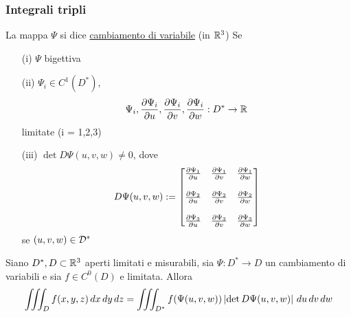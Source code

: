 \subsubsection{Integrali tripli}
\begin{definition}
  La mappa $\Psi$ si dice \underline{cambiamento di variabile} (in $\mathbb{R}^3$) Se
  \begin{itemize}
    \item[(i)] $\Psi$ \ace bigettiva
    \item[(ii)] $\Psi_i \in C^1(D^*)$, 
                $$\Psi_i, \frac{\partial \Psi_i}{\partial u}, \frac{\partial \Psi_i}{\partial v}, \frac{\partial \Psi_i}{\partial w} : D^* \to \mathbb{R}$$
                limitate (i = 1,2,3) 
    \item[(iii)] $\det D\Psi(u,v,w) \neq 0$, dove 
                $$D\Psi(u,v,w) := \begin{bmatrix}
                  \frac{\partial \Psi_1}{\partial u} & \frac{\partial \Psi_1}{\partial v} & \frac{\partial \Psi_1}{\partial w} \\
                  \\
                  \frac{\partial \Psi_2}{\partial u} & \frac{\partial \Psi_2}{\partial v} & \frac{\partial \Psi_2}{\partial w} \\
                  \\
                  \frac{\partial \Psi_3}{\partial u} & \frac{\partial \Psi_3}{\partial v} & \frac{\partial \Psi_3}{\partial w} \\
                \end{bmatrix}$$
                se $(u,v,w)\in\mathcal{D}^*$
  \end{itemize}
\end{definition}
\begin{theorem}
  Siano $D^*, D \subset \mathbb{R}^3$ aperti limitati e misurabili, sia 
  $\Psi : D^* \to D$ un cambiamento di variabili e sia $f \in C^0(D)$ e limitata.
  Allora 
  $$\iiint_{D} f(x,y,z) \,dx\,dy\,dz = \iiint_{D^*} f(\Psi(u,v,w)) \left\lvert \det D\Psi(u,v,w) \right\rvert \,du\,dv\,dw$$
\end{theorem}